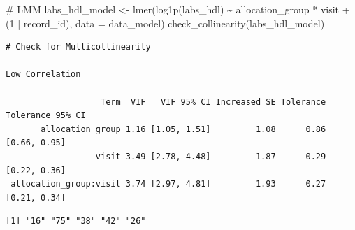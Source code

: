 \documentclass[
  12pt,
]{article}
\newenvironment{Shaded}{\begin{snugshade}}{\end{snugshade}}
\newcommand{\AttributeTok}[1]{\textcolor[rgb]{0.40,0.45,0.13}{#1}}
\newcommand{\CommentTok}[1]{\textcolor[rgb]{0.37,0.37,0.37}{#1}}
\newcommand{\DecValTok}[1]{\textcolor[rgb]{0.68,0.00,0.00}{#1}}
\newcommand{\FunctionTok}[1]{\textcolor[rgb]{0.28,0.35,0.67}{#1}}
\newcommand{\NormalTok}[1]{\textcolor[rgb]{0.00,0.23,0.31}{#1}}
\newcommand{\OtherTok}[1]{\textcolor[rgb]{0.00,0.23,0.31}{#1}}
\newcommand{\SpecialCharTok}[1]{\textcolor[rgb]{0.37,0.37,0.37}{#1}}
\newcommand{\StringTok}[1]{\textcolor[rgb]{0.13,0.47,0.30}{#1}}
\begin{document}
\begin{Shaded}
\begin{Highlighting}[]
\CommentTok{\# LMM}
\NormalTok{labs\_hdl\_model }\OtherTok{\textless{}{-}} \FunctionTok{lmer}\NormalTok{(}\FunctionTok{log1p}\NormalTok{(labs\_hdl) }\SpecialCharTok{\textasciitilde{}}\NormalTok{ allocation\_group }\SpecialCharTok{*}\NormalTok{ visit }\SpecialCharTok{+} 
\NormalTok{(}\DecValTok{1} \SpecialCharTok{|}\NormalTok{ record\_id), }\AttributeTok{data =}\NormalTok{ data\_model)}
\FunctionTok{check\_collinearity}\NormalTok{(labs\_hdl\_model)}
\end{Highlighting}
\end{Shaded}

\begin{verbatim}
# Check for Multicollinearity

Low Correlation

                   Term  VIF   VIF 95% CI Increased SE Tolerance Tolerance 95% CI
       allocation_group 1.16 [1.05, 1.51]         1.08      0.86     [0.66, 0.95]
                  visit 3.49 [2.78, 4.48]         1.87      0.29     [0.22, 0.36]
 allocation_group:visit 3.74 [2.97, 4.81]         1.93      0.27     [0.21, 0.34]
\end{verbatim}

\begin{Shaded}
\end{Shaded}

\begin{verbatim}
[1] "16" "75" "38" "42" "26"
\end{verbatim}
\end{document}
